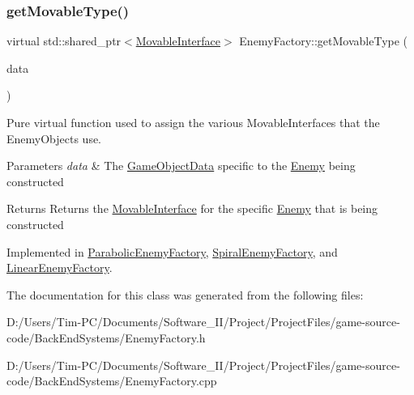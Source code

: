 \subsubsection{\texorpdfstring{get\+Movable\+Type()}{getMovableType()}}
{\footnotesize\ttfamily virtual std\+::shared\+\_\+ptr$<$\hyperlink{class_movable_interface}{Movable\+Interface}$>$ Enemy\+Factory\+::get\+Movable\+Type (\begin{DoxyParamCaption}\item[{const \hyperlink{struct_game_object_data}{Game\+Object\+Data} \&}]{data }\end{DoxyParamCaption})\hspace{0.3cm}{\ttfamily [pure virtual]}}



Pure virtual function used to assign the various Movable\+Interfaces that the Enemy\+Objects use. 


\begin{DoxyParams}{Parameters}
{\em data} & The \hyperlink{struct_game_object_data}{Game\+Object\+Data} specific to the \hyperlink{class_enemy}{Enemy} being constructed \\
\hline
\end{DoxyParams}
\begin{DoxyReturn}{Returns}
Returns the \hyperlink{class_movable_interface}{Movable\+Interface} for the specific \hyperlink{class_enemy}{Enemy} that is being constructed 
\end{DoxyReturn}


Implemented in \hyperlink{class_parabolic_enemy_factory_aaf1f3323e4c723f669a11c20a7e38efe}{Parabolic\+Enemy\+Factory}, \hyperlink{class_spiral_enemy_factory_aa05ff998b19ec4ef7ddd86ff24f70cba}{Spiral\+Enemy\+Factory}, and \hyperlink{class_linear_enemy_factory_ad8b2931b7f31f9f8e13d3c9d804469bf}{Linear\+Enemy\+Factory}.



The documentation for this class was generated from the following files\+:\begin{DoxyCompactItemize}
\item 
D\+:/\+Users/\+Tim-\/\+P\+C/\+Documents/\+Software\+\_\+\+I\+I/\+Project/\+Project\+Files/game-\/source-\/code/\+Back\+End\+Systems/Enemy\+Factory.\+h\item 
D\+:/\+Users/\+Tim-\/\+P\+C/\+Documents/\+Software\+\_\+\+I\+I/\+Project/\+Project\+Files/game-\/source-\/code/\+Back\+End\+Systems/Enemy\+Factory.\+cpp\end{DoxyCompactItemize}
